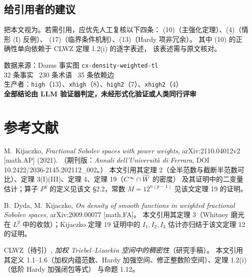 \subsection*{给引用者的建议}

把本文视为。若需引用，应优先人工复核以下四条：
(10)（主强化定理）、(4)（情形 (I) 反例）、
(17)（临界条件机制）、(13)（Hardy 项非冗余）。
其中 (10) 的正确性单向依赖于 CLWZ 定理 1.2(i) 的逐字表述，
该表述需与原文核对。

\bigskip
\begin{center}
\small
数据来源：Danus 事实图 \texttt{cx-density-weighted-tl}\\
32 条事实 \textbullet\ 230 条术语 \textbullet\ 35 条依赖边\\
生产者：\texttt{high}（13）、\texttt{xhigh}（8）、\texttt{high2}（7）、\texttt{xhigh2}（4）\\
\textbf{全部结论由 LLM 验证器判定，未经形式化验证或人类同行评审}
\end{center}

\newpage
\section*{参考文献}

\begin{enumerate}[label={[\arabic*]},leftmargin=2.2em,itemsep=2pt]
  \item\label{ref:K} M.~Kijaczko, \emph{Fractional Sobolev spaces with power weights},
        arXiv:2110.04012v2 [math.AP] (2021).
        （期刊版：\emph{Annali dell'Universit\`a di Ferrara}, DOI 10.2422/2036-2145.202112\_002。）
        本文引用其定理 2（全半范数与截断半范数可比）、定理 3(I)(III)、定理 4、定理 19（$C^\infty\cap\widetilde W$ 的密度）
        及其证明中的二变量估计；算子 $P^\eta$ 的定义见该文 \S 2.2，常数 $M=12^{n(p-1)}$ 见该文定理 19 的证明。

  \item\label{ref:DK} B.~Dyda, M.~Kijaczko, \emph{On density of smooth functions in weighted fractional Sobolev spaces},
        arXiv:2009.00077 [math.FA]。
        本文引用其定理 3（Whitney 磨光在 $L^p$ 中的收敛）；Kijaczko 定理 19 证明中的 $I_1,I_2,I_3$ 估计亦归结于该文定理 12 的证明。

  \item\label{ref:CLWZ} CLWZ（待引）, \emph{加权 Triebel--Lizorkin 空间中的稠密性}（研究手稿）。
        本文引用其定义 1.1--1.6（加权内蕴范数、Hardy 加强空间、修正整数阶空间）、定理 1.2(i)（低阶 Hardy 加强闭包等式）
        与命题 1.12。
\end{enumerate}

